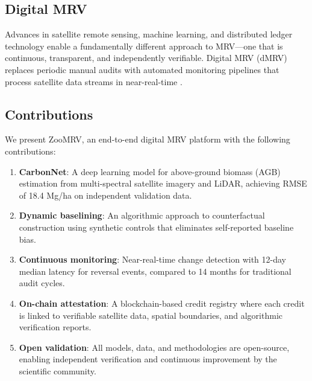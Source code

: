 \subsection{Digital MRV}

Advances in satellite remote sensing, machine learning, and distributed
ledger technology enable a fundamentally different approach to MRV---one
that is continuous, transparent, and independently verifiable. Digital
MRV (dMRV) replaces periodic manual audits with automated monitoring
pipelines that process satellite data streams in near-real-time
\citep{fuss2020moving}.

\subsection{Contributions}

We present ZooMRV, an end-to-end digital MRV platform with the following
contributions:

\begin{enumerate}
  \item \textbf{CarbonNet}: A deep learning model for above-ground
    biomass (AGB) estimation from multi-spectral satellite imagery and
    LiDAR, achieving RMSE of 18.4 Mg/ha on independent validation data.

  \item \textbf{Dynamic baselining}: An algorithmic approach to
    counterfactual construction using synthetic controls
    \citep{abadie2010synthetic} that eliminates self-reported baseline
    bias.

  \item \textbf{Continuous monitoring}: Near-real-time change detection
    with 12-day median latency for reversal events, compared to 14
    months for traditional audit cycles.

  \item \textbf{On-chain attestation}: A blockchain-based credit
    registry where each credit is linked to verifiable satellite data,
    spatial boundaries, and algorithmic verification reports.

  \item \textbf{Open validation}: All models, data, and methodologies
    are open-source, enabling independent verification and continuous
    improvement by the scientific community.
\end{enumerate}


